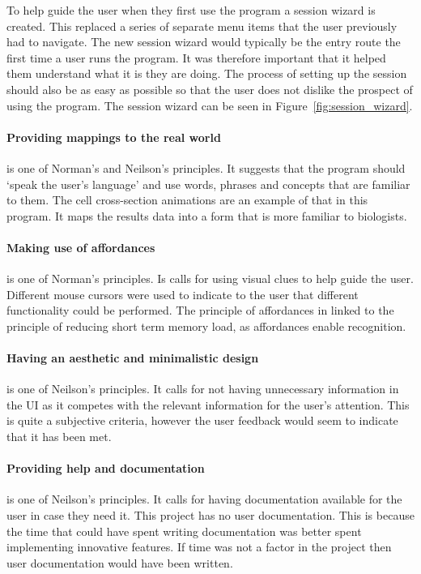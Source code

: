 To help guide the user when they first use the program a session wizard is created.  This replaced a series of separate menu items that the user previously had to navigate. The new session wizard would typically be the entry route the first time a user runs the program.  It was therefore important that it helped them understand what it is they are doing.  The process of setting up the session should also be as easy as possible so that the user does not dislike the prospect of using the program.  The session wizard can be seen in Figure~\ref{fig:session_wizard}.

\paragraph*{Providing mappings to the real world} is one of Norman's and Neilson's principles.  It suggests that the program should `speak the user's language' and use words, phrases and concepts that are familiar to them.  The cell cross-section animations are an example of that in this program.  It maps the results data into a form that is more familiar to biologists.

\paragraph*{Making use of affordances} is one of Norman's principles.  Is calls for using visual clues to help guide the user.  Different mouse cursors were used to indicate to the user that different functionality could be performed.  The principle of affordances in linked to the principle of reducing short term memory load, as affordances enable recognition.

\paragraph*{Having an aesthetic and minimalistic design} is one of Neilson's principles.  It calls for not having unnecessary information in the \ac{UI} as it competes with the relevant information for the user's attention.  This is quite a subjective criteria, however the user feedback would seem to indicate that it has been met.

\paragraph*{Providing help and documentation} is one of Neilson's principles.  It calls for having documentation available for the user in case they need it.  This project has no user documentation.  This is because the time that could have spent writing documentation was better spent implementing innovative features.  If time was not a factor in the project then user documentation would have been written.

